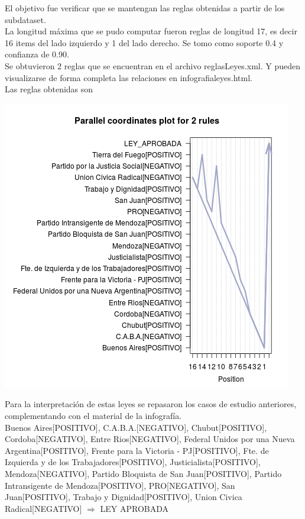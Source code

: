 \documentclass{endm}
\begin{document}
El objetivo fue verificar que se mantengan las reglas obtenidas a partir de los subdataset.  \\

La longitud máxima que se pudo computar fueron reglas de longitud 17, es decir 16 items del lado izquierdo y 1 del lado derecho. Se tomo como soporte 0.4 y confianza de 0.90.  \\

Se obtuvieron 2 reglas que se encuentran en el archivo reglasLeyes.xml. Y pueden visualizarse de forma completa las relaciones en infografialeyes.html.\\

Las reglas obtenidas son \\

\begin{center}
\includegraphics[scale=0.4]{graficos/paracoordLeyes.png} \\
\end{center} 

Para la interpretación de estas leyes se repasaron los casos de estudio anteriores, complementando con el material de la infografía. \\

{Buenos Aires[POSITIVO],                    
C.A.B.A.[NEGATIVO],                         
Chubut[POSITIVO],                           
Cordoba[NEGATIVO],                          
Entre Rios[NEGATIVO],                       
Federal Unidos por una Nueva Argentina[POSITIVO],                       
Frente para la Victoria - PJ[POSITIVO],     
Fte. de Izquierda y de los Trabajadores[POSITIVO],  
Justicialista[POSITIVO],                    
Mendoza[NEGATIVO],  
Partido Bloquista de San Juan[POSITIVO],    
Partido Intransigente de Mendoza[POSITIVO], 
PRO[NEGATIVO], 
San Juan[POSITIVO],
Trabajo y Dignidad[POSITIVO],            
Union Civica Radical[NEGATIVO]}                 $\Longrightarrow$ {LEY APROBADA} \\
\end{document}
